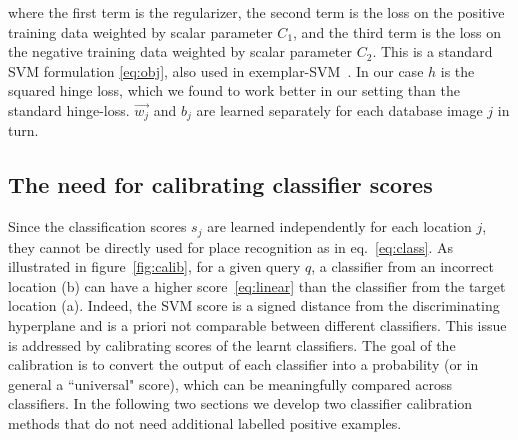       \noindent
      where the first term is the regularizer, the second term is the loss on the positive training data weighted by scalar parameter $C_1$, and the third term is the loss on the negative training data weighted by scalar parameter $C_2$.   
      This is a standard SVM formulation \eqref{eq:obj}, also used in exemplar-SVM~\cite{Malisiewicz11}.
      In our case $h$ is the squared hinge loss, which we found to work better in our setting than the standard hinge-loss. $\vec{w_j}$ and $b_j$ are learned separately for each database image $j$ in turn. 
      

   \subsection{The need for calibrating classifier scores}
   Since the classification scores $s_j$ are learned independently for each location $j$, they cannot be directly used for place recognition as in eq.~\eqref{eq:class}. As illustrated in figure~\ref{fig:calib}, for a given query $q$, a classifier from an incorrect location (b) can have a higher score~\eqref{eq:linear} than the classifier from the target location (a). Indeed, the SVM score is a signed distance from the discriminating hyperplane and is a priori not comparable between different classifiers. This issue is addressed by calibrating scores of the learnt classifiers. The goal of the calibration is to convert the output of each classifier into a probability (or in general a ``universal" score), which can be meaningfully compared across classifiers. In the following two sections we develop two classifier calibration methods that do not need additional labelled positive examples.


